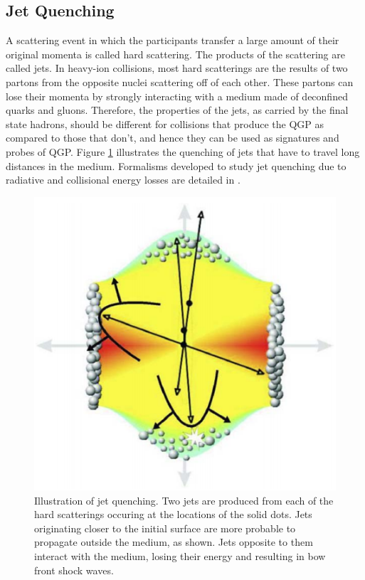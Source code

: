 \subsection{Jet Quenching}
A scattering event in which the participants transfer a large amount of their original momenta is called hard scattering. The products of the scattering%
 are called jets. In heavy-ion collisions, most hard scatterings are the results of two partons from the opposite nuclei scattering off of each other. These partons can lose their momenta by strongly interacting with a medium made of deconfined quarks and gluons. Therefore, the properties of the jets, as carried by the final state hadrons, should be different for collisions that produce the QGP as compared to those that don't, and hence they can be used as signatures and probes of QGP. Figure \ref{fig:jets} illustrates the quenching of jets that have to travel long distances in the medium. %
Formalisms developed to study jet quenching due to radiative and collisional energy losses are detailed in \cite{2015IJMPE..2430014Q}. 
	\begin{figure}[h]
	  \centering
	  \includegraphics[width=4.5in]{figures/jets.PNG}
	  \caption{Illustration of jet quenching. Two jets are produced from each of the hard scatterings occuring at the locations of the solid dots. Jets originating closer to the initial surface are more probable to propagate outside the medium, as shown. Jets opposite to them interact with the medium, losing their energy and resulting in bow front shock waves.\cite{STOCKER2005121}}\label{fig:jets}
	\end{figure}

